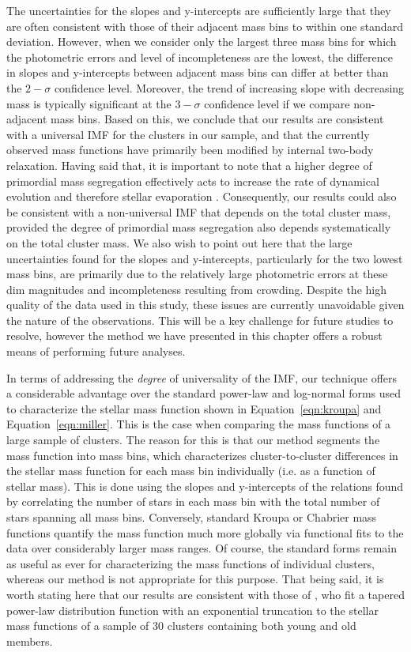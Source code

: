 The uncertainties for the slopes and 
y-intercepts are sufficiently large that they are often consistent with
those of their adjacent mass bins to within one standard deviation.
However, when we consider only the largest three mass bins for which
the photometric errors and level of incompleteness are the lowest, the
difference in slopes and y-intercepts between adjacent mass bins can
differ at better than the $2-\sigma$ confidence level.  Moreover, the
trend of increasing slope with decreasing mass is typically
significant at the $3-\sigma$ confidence level if we compare
non-adjacent mass bins.  Based on this, we conclude that our results
are consistent with a universal IMF for the clusters in our sample,
and that the currently observed mass functions have primarily been 
modified by internal two-body relaxation.  Having said that, it is
important to note that a higher degree of primordial mass segregation
effectively acts
to increase the rate of dynamical evolution and therefore stellar
evaporation \citep[e.g.][]{heggie03}.  Consequently, our results could
also be consistent with a non-universal IMF that depends on the total
cluster mass, provided the degree of primordial mass segregation also
depends systematically on the total cluster mass.  We also wish to
point out here 
that the large uncertainties found for the slopes and y-intercepts,
particularly for the two lowest mass bins, are primarily due to the
relatively large photometric errors at these dim magnitudes and
incompleteness resulting from crowding.  Despite the high quality of
the data used in this study, these issues are currently unavoidable
given the nature of the observations.  This will be a key challenge
for future studies to resolve, however the method we have presented
in this chapter offers a robust means of performing future analyses.

In terms of addressing the \textit{degree} of universality of the IMF,
our technique offers a considerable advantage over the standard
power-law and log-normal forms used to characterize the stellar mass
function shown in Equation~\ref{eqn:kroupa} and
Equation~\ref{eqn:miller}.  This is the case when comparing the mass
functions of a large sample of clusters.  The reason for this is that
our method
segments the mass function into mass bins, which characterizes
cluster-to-cluster differences in the stellar mass function for each
mass bin individually (i.e. as a function of stellar mass).  This
is done using the slopes and y-intercepts of the
relations found by correlating the number of stars in each mass bin
with the total number of stars spanning all mass bins.  Conversely,
standard Kroupa or Chabrier mass functions quantify the mass function
much more globally via functional fits to the data over considerably
larger mass ranges.  Of course, the standard forms
remain as useful as ever for characterizing the mass functions of
individual clusters, whereas our method is not appropriate for
this purpose.  That being
said, it is worth stating here that our results 
are consistent with those of \citet{demarchi10}, who fit a tapered
power-law distribution function with an exponential truncation to the
stellar mass functions of a sample of 30 clusters containing both
young and old members. 

